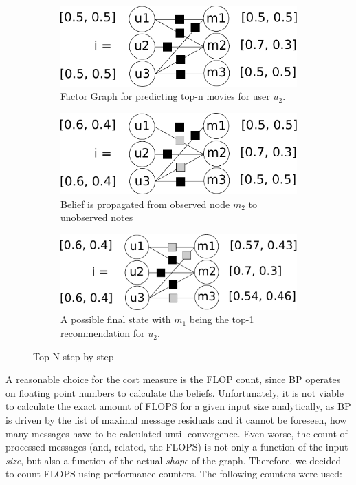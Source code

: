 \begin{figure}
	\centering
	\begin{subfigure}{.6\columnwidth}
	   \includegraphics[scale=0.3]{graphics/top-n-graph.pdf}%
	      \caption{Factor Graph for predicting top-n movies for user $u_2$.
	      \label{top_n_graph}
	   }
	\end{subfigure}\hfill%
	\begin{subfigure}{.6\columnwidth}
	   \includegraphics[scale=0.3]{graphics/top-n-important-messages.pdf}%
      	   \caption{Belief is propagated from observed node $m_2$ to unobserved notes 
	      \label{top_n_graph_important_msg}
	   }
	\end{subfigure}\hfill%
	\begin{subfigure}{.6\columnwidth}
	   \includegraphics[scale=0.3]{graphics/top-n-final.pdf}%
	      \caption{A possible final state with $m_1$ being the top-1 recommendation for $u_2$. 
	      \label{top_n_graph_final_state}
	   }
	\end{subfigure}
	\caption{Top-N step by step}
\end{figure}

A reasonable choice for the cost measure is the FLOP count, since BP operates on floating point numbers to calculate the beliefs. Unfortunately, it is not viable to calculate the exact amount of FLOPS for a given input size analytically, as BP is driven by the list of maximal message residuals and it cannot be foreseen, how many messages have to be calculated until convergence. Even worse, the count of processed messages (and, related, the FLOPS) is not only a function of the input \textit{size}, but also a function of the actual \textit{shape} of the graph. Therefore, we decided to count FLOPS using performance counters. The following counters were used:

